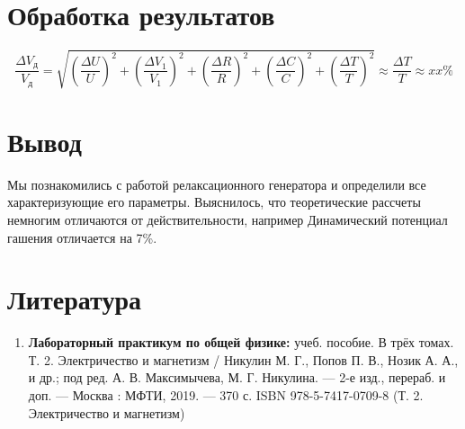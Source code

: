 \documentclass[a4paper, 12pt]{article}%
\begin{document}
\section{Обработка результатов}


$$\frac{\Delta V_{д}}{V_{д}} = \sqrt{\left(\frac{\Delta U}{U} \right)^2 + \left(\frac{\Delta V_1}{V_1} \right)^2 + \left(\frac{\Delta R}{R} \right)^2 + \left(\frac{\Delta C}{C} \right)^2 + \left(\frac{\Delta T}{T} \right)^2} \approx  \frac{\Delta T}{T}  \approx xx\%$$

\section{Вывод}

Мы познакомились с работой релаксационного генератора и определили все характеризующие его параметры.  Выяснилось, что теоретические рассчеты немногим отличаются от действительности, например Динамический потенциал гашения отличается на 7\%. 


\section{Литература}

\begin{enumerate}
\item \textbf{Лабораторный практикум по общей физике:} учеб. пособие. В трёх томах. Т. 2. Электричество и магнетизм /
Никулин М. Г., Попов П. В., Нозик А. А., и др.; под ред. А. В. Мак­симычева, М. Г. Никулина. — 2-е изд., перераб. и доп. — Москва : МФТИ, 2019. — 370 с.
ISBN 978-5-7417-0709-8 (Т. 2. Электричество и магнетизм)
\end{enumerate}		
		
\end{document}
